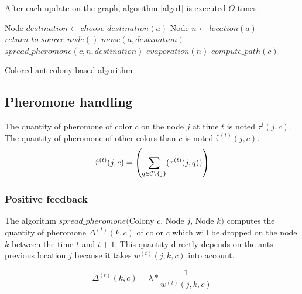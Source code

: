 \documentclass[a4paper,10pt]{article}
\begin{document}
After each update on the graph, algorithm \ref{algo1} is executed $\Theta$ times.\\

\begin{algorithm}[h]
\begin{algorithmic} 

\STATE Node $destination \leftarrow choose\_destination(a)$
\STATE Node $n \leftarrow location(a)$
\STATE $return\_to\_source\_node()$
\ELSE
\STATE $move(a, destination)$
\STATE $spread\_pheromone(c, n, destination)$
\ENDIF
\ENDFOR
{}
\STATE $evaporation(n)$
\ENDFOR
{}
\STATE $compute\_path(c)$
\ENDFOR
\end{algorithmic}
\caption{Colored ant colony based algorithm}
\label{algo1}
\end{algorithm}


\subsection{Pheromone handling}

The quantity of pheromone of color $c$ on the node $j$ at time $t$ is noted $\tau^{t}(j,c)$. The quantity of pheromone of other colors than $c$ is noted $\hat \tau^{(t)}(j,c)$.
\begin{equation*}
    \hat \tau^{(t)}(j,c) = \left( \sum_{q \in \cal{C}\backslash\{c\}}(\tau^{(t)} (j,q)) \right)
\end{equation*}



\subsubsection{Positive feedback}
The algorithm $spread\_pheromone($Colony $c$, Node $j$, Node $k)$ computes the quantity of pheromone $\Delta^{(t)}(k,c)$ of color $c$  which will be dropped on the node $k$ between the time $t$ and $t+1$. This quantity directly depends on the ants previous location $j$ because it takes $w^{(t)}(j,k,c)$ into account.

\begin{equation*}
 \Delta^{(t)}(k,c) = \lambda * \frac{1}{w^{(t)}(j,k,c)}
\end{equation*}
\end{document}
